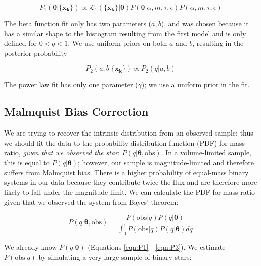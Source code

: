 \documentclass{emulateapj}
\renewcommand{\vec}[1]{\bm{#1}}
\begin{document}
\begin{equation}
P_1(\vec{\theta} | \{\vec{x_k}\}) \propto \mathcal{L}_1(\{\vec{x_k}\}| \vec{\theta}) P(\vec{\theta}| \alpha, m, \tau, \epsilon) P(\alpha, m, \tau, \epsilon)
\end{equation}

The beta function fit only has two parameters ($a, b$), and was chosen because it has a similar shape to the histogram resulting from the first model and is only defined for $0 < q < 1$. We use uniform priors on both $a$ and $b$, resulting in the posterior probability 

\begin{equation}
P_2(a, b | \{\vec{x_k}\}) \propto P_2(q|a, b) 
\end{equation}

The power law fit has only one parameter ($\gamma$); we use a uniform prior in the fit.

\subsection{Malmquist Bias Correction}

We are trying to recover the intrinsic distribution from an observed sample; thus we should fit the data to the probability distribution function (PDF) for mass ratio, \emph{given that we observed the star}: $P(q|\vec{\theta}, \mathrm{obs})$. In a volume-limited sample, this is equal to $P(q|\vec{\theta})$; however, our sample is magnitude-limited and therefore suffers from Malmquist bias. There is a higher probability of equal-mass binary systems in our data because they contribute twice the flux and are therefore more likely to fall under the magnitude limit. We can calculate the PDF for mass ratio given that we observed the system from Bayes' theorem:

\begin{equation}
P(q|\vec{\theta}, \mathrm{obs}) = \frac{P(\mathrm{obs}|q) P(q|\vec{\theta})}{\int_0^1 P(\mathrm{obs}|q) P(q|\vec{\theta}) dq}
\end{equation}

We already know $P(q|\vec{\theta})$ (Equations \ref{eqn:P1} - \ref{eqn:P3}). We estimate $P(\mathrm{obs}|q)$ by simulating a very large sample of binary stars:
\end{document}
